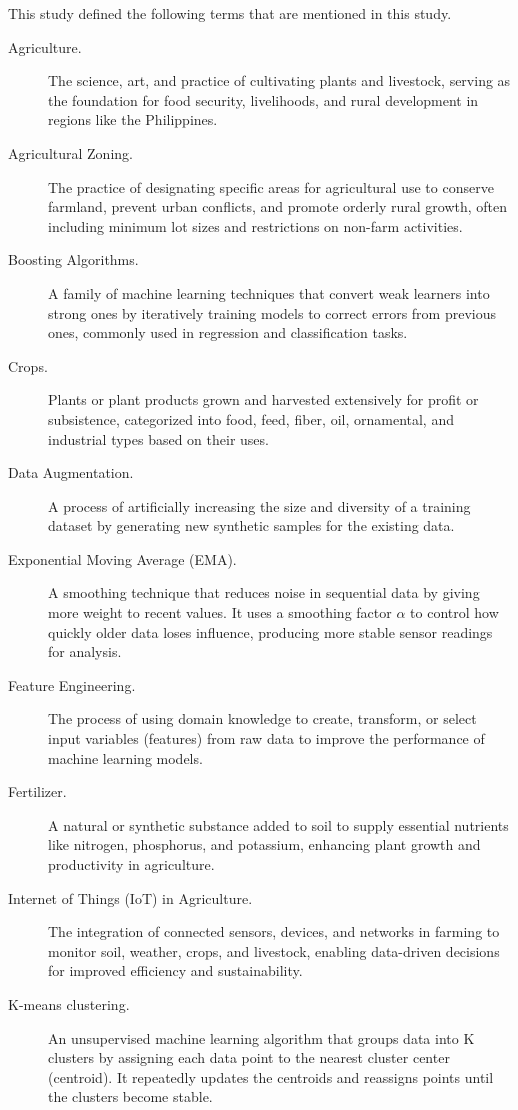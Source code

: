 {	This study defined the following terms that are mentioned in this study.
	\begin{description}
		\item[Agriculture.] 
		The science, art, and practice of cultivating plants and livestock, serving as the foundation for food security, livelihoods, and rural development in regions like the Philippines.
		\item[Agricultural Zoning.] 
		The practice of designating specific areas for agricultural use to conserve farmland, prevent urban conflicts, and promote orderly rural growth, often including minimum lot sizes and restrictions on non-farm activities.
		\item[Boosting Algorithms.] 
		A family of machine learning techniques that convert weak learners into strong ones by iteratively training models to correct errors from previous ones, commonly used in regression and classification tasks.
		\item[Crops.] 
		Plants or plant products grown and harvested extensively for profit or subsistence, categorized into food, feed, fiber, oil, ornamental, and industrial types based on their uses.
		\item[Data Augmentation.]
		A process of artificially increasing the size and diversity of a training dataset by generating new synthetic samples for the existing data.
		\item[Exponential Moving Average (EMA).]
		A smoothing technique that reduces noise in sequential data by giving more weight to recent values. It uses a smoothing factor $\alpha$ to control how quickly older data loses influence, producing more stable sensor readings for analysis.
		\item[Feature Engineering.] 
		The process of using domain knowledge to create, transform, or select input variables (features) from raw data to improve the performance of machine learning models.
		\item[Fertilizer.] 
		A natural or synthetic substance added to soil to supply essential nutrients like nitrogen, phosphorus, and potassium, enhancing plant growth and productivity in agriculture.
		\item[Internet of Things (IoT) in Agriculture.] 
		The integration of connected sensors, devices, and networks in farming to monitor soil, weather, crops, and livestock, enabling data-driven decisions for improved efficiency and sustainability.
		\item[K-means clustering.] 
		An unsupervised machine learning algorithm that groups data into K clusters by assigning each data point to the nearest cluster center (centroid). It repeatedly updates the centroids and reassigns points until the clusters become stable.

\end{description}}
